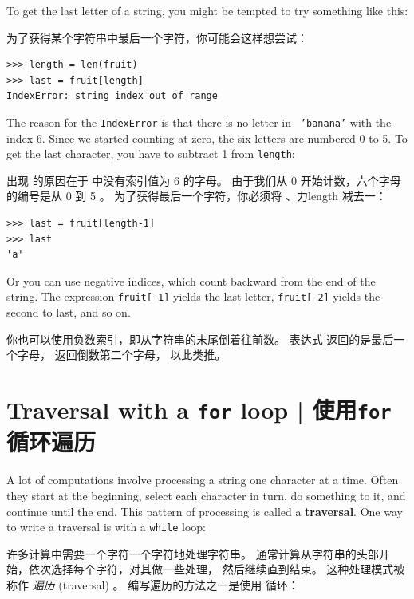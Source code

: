 %
To get the last letter of a string, you might be tempted to try something
like this:
  

为了获得某个字符串中最后一个字符，你可能会这样想尝试：

\begin{lstlisting}
>>> length = len(fruit)
>>> last = fruit[length]
IndexError: string index out of range
\end{lstlisting}

%
The reason for the {\tt IndexError} is that there is no letter in {\tt
'banana'} with the index 6.  Since we started counting at zero, the
six letters are numbered 0 to 5.  To get the last character, you have
to subtract 1 from {\tt length}:

出现  的原因在于  中没有索引值为 6 的字母。 由于我们从 0 开始计数，六个字母的编号是从 0 到 5 。 为了获得最后一个字符，你必须将 、力{length} 减去一：

\begin{lstlisting}
>>> last = fruit[length-1]
>>> last
'a'
\end{lstlisting}

%
Or you can use negative indices, which count backward from
the end of the string.  The expression {\tt fruit[-1]} yields the last
letter, {\tt fruit[-2]} yields the second to last, and so on.
  

你也可以使用负数索引，即从字符串的末尾倒着往前数。 表达式  返回的是最后一个字母，  返回倒数第二个字母， 以此类推。
  
  


\section{Traversal with a {\tt for} loop  |  使用{\tt for}循环遍历}
\label{for}
  
  
  

A lot of computations involve processing a string one character at a
time.  Often they start at the beginning, select each character in
turn, do something to it, and continue until the end.  This pattern of
processing is called a {\bf traversal}.  One way to write a traversal
is with a {\tt while} loop:

许多计算中需要一个字符一个字符地处理字符串。 通常计算从字符串的头部开始，依次选择每个字符，对其做一些处理，
然后继续直到结束。 这种处理模式被称作 {\em 遍历} (traversal) 。 编写遍历的方法之一是使用  循环：


